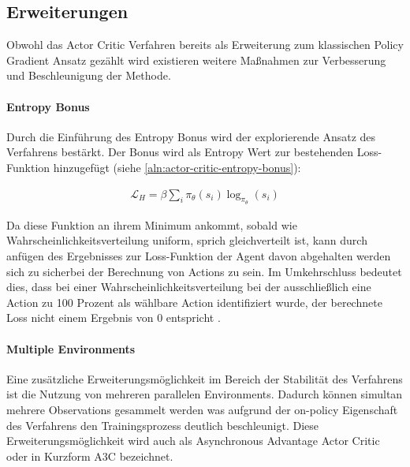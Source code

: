 \documentclass[11pt]{scrartcl}
\begin{document}
\subsection{Erweiterungen}
Obwohl das Actor Critic Verfahren bereits als Erweiterung zum klassischen Policy Gradient Ansatz
gezählt wird existieren weitere Maßnahmen zur Verbesserung und Beschleunigung der Methode.

\paragraph*{Entropy Bonus} 
\noindent
\newline
Durch die Einführung des Entropy Bonus wird der explorierende Ansatz des Verfahrens bestärkt.
Der Bonus wird als Entropy Wert zur bestehenden Loss-Funktion hinzugefügt (siehe
\ref{aln:actor-critic-entropy-bonus}):

\begin{align}
\mathcal{L}_H=\beta\sum_i\pi_\theta(s_i)\log_{\pi_\theta}(s_i)
\label{aln:actor-critic-entropy-bonus}
\end{align}

Da diese Funktion an ihrem Minimum ankommt, sobald wie Wahrscheinlichkeitsverteilung uniform,
sprich gleichverteilt ist, kann durch anfügen des Ergebnisses zur Loss-Funktion der Agent davon
abgehalten werden sich \grqq zu sicher\grqq bei der Berechnung von Actions zu sein. Im
Umkehrschluss bedeutet dies, dass bei einer Wahrscheinlichkeitsverteilung bei der ausschließlich
eine Action zu 100 Prozent als wählbare Action identifiziert wurde, der berechnete Loss nicht
einem Ergebnis von 0 entspricht \cite[~S.269 f.]{L2018}.

\paragraph*{Multiple Environments} 
\noindent
\newline
Eine zusätzliche Erweiterungsmöglichkeit im Bereich der Stabilität des Verfahrens ist die Nutzung
von mehreren parallelen Environments. Dadurch können simultan mehrere Observations gesammelt werden
was aufgrund der on-policy Eigenschaft des Verfahrens den Trainingsprozess deutlich beschleunigt.
Diese Erweiterungsmöglichkeit wird auch als Asynchronous Advantage Actor Critic oder in Kurzform
A3C bezeichnet.

\newpage
\end{document}
